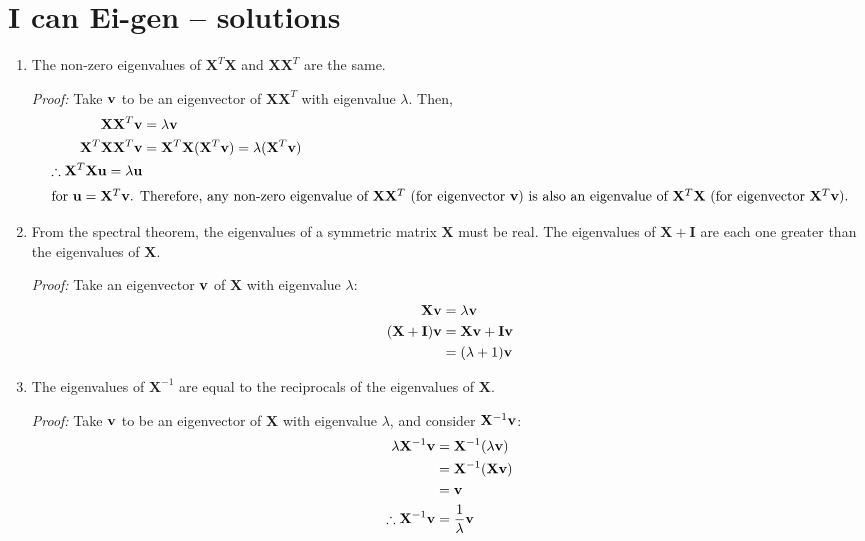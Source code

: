 \documentclass[submit]{harvardml}
\renewcommand{\v}[1]{\mathbf{#1}}
\newcommand{\XXT}{\ensuremath{\v X \v X^T}}
\newcommand{\XTX}{\ensuremath{\v X^T \v X}}
\begin{document}
\section*{I can Ei-gen -- solutions}
\begin{enumerate}[label=(\alph*)]
\item
  The non-zero eigenvalues of $\XTX$ and $\XXT$ are the
  same. 

  \textit{Proof:} Take $\mathbf{v}$ to be an eigenvector of \XXT{} with
  eigenvalue $\lambda$. Then,
  \begin{align*}
    \XXT \boldv &= \lambda \boldv\\
    \v X^T \XXT \boldv &= \XTX(\v X^T \boldv) = \lambda(\v X^T
    \boldv)\\
    \therefore \XTX \boldu = \lambda \boldu\\
    \intertext{for $\boldu = \v X^T \boldv$. Therefore, any non-zero eigenvalue
    of $\XXT$ (for eigenvector $\boldv$) is also an eigenvalue of
    $\XTX$ (for eigenvector $\v X^T \boldv$).}
  \end{align*}
\item
  From the spectral theorem, the eigenvalues of a symmetric matrix $\v X$ must be
  real. The eigenvalues of $\v X + \v I$ are each one greater than the
  eigenvalues of $\v X$.

  \textit{Proof:} Take an eigenvector $\mathbf{v}$ of $\v X$ with
  eigenvalue $\lambda$:
  \begin{align*}
    \v X \boldv &= \lambda \boldv\\
    (\v X + \v I)\boldv &= \v X \boldv + \v I \boldv \\
    &=(\lambda+1)\boldv\\ 
  \end{align*}
\item
  The eigenvalues of $\v X^{-1}$ are equal to the reciprocals of the
  eigenvalues of $\v X$.

  \textit{Proof:} Take $\mathbf{v}$ to be an eigenvector of $\v X$ with
  eigenvalue $\lambda$, and consider $\v X^{-1} \boldv$:
  \begin{align*}
    \lambda \v X^{-1} \boldv &= \v X^{-1}(\lambda \boldv)\\
    &= \v X^{-1} (\v X \boldv)\\
    &= \boldv\\
    \therefore \v X^{-1} \boldv &= \frac{1}{\lambda} \boldv
  \end{align*}
\end{enumerate}
\end{document}
